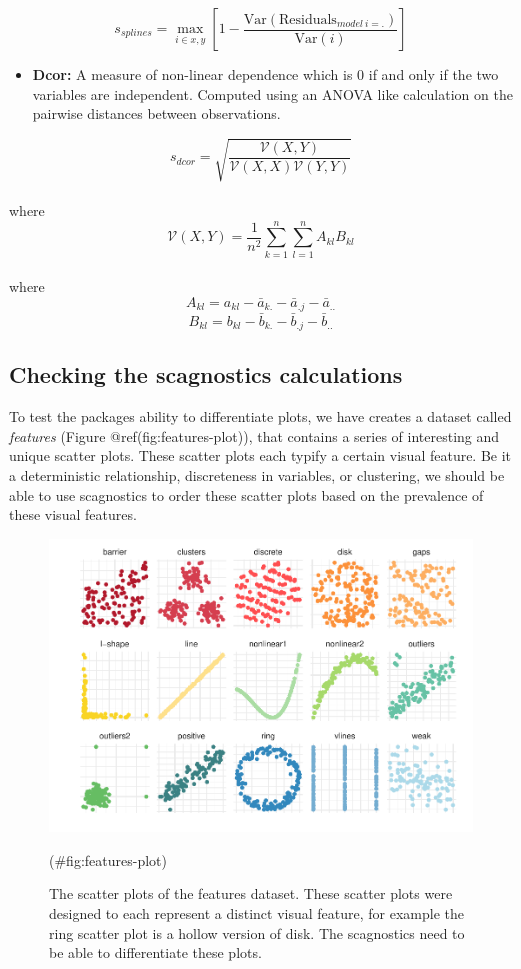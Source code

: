 \[s_{splines}=\max_{i\in x,y}\left[ 1-\frac{\mbox{Var}(\mbox{Residuals}_{model~i=.})}{\mbox{Var}(i)}\right] \]

\begin{itemize}
\tightlist
\item
  \textbf{Dcor:} A measure of non-linear dependence which is 0 if and
  only if the two variables are independent. Computed using an ANOVA
  like calculation on the pairwise distances between observations.
\end{itemize}

\[s_{dcor}= \sqrt{\frac{\mathcal{V}(X,Y)}{\mathcal{V}(X,X)\mathcal{V}(Y,Y)}}\]\\
where \[\mathcal{V}
(X,Y)=\frac{1}{n^2}\sum_{k=1}^n\sum_{l=1}^nA_{kl}B_{kl}\]\\
where \[A_{kl}=a_{kl}-\bar{a}_{k.}-\bar{a}_{.j}-\bar{a}_{..}\]
\[B_{kl}=b_{kl}-\bar{b}_{k.}-\bar{b}_{.j}-\bar{b}_{..}\]

\hypertarget{checking-the-scagnostics-calculations}{%
\subsection{Checking the scagnostics
calculations}\label{checking-the-scagnostics-calculations}}

To test the packages ability to differentiate plots, we have creates a
dataset called \emph{features} (Figure @ref(fig:features-plot)), that
contains a series of interesting and unique scatter plots. These scatter
plots each typify a certain visual feature. Be it a deterministic
relationship, discreteness in variables, or clustering, we should be
able to use scagnostics to order these scatter plots based on the
prevalence of these visual features.

\begin{Schunk}
\begin{figure}
\includegraphics[width=1\linewidth]{mason-lee-laa-cook_files/figure-latex/features-plot-1} \caption[The scatter plots of the features dataset]{The scatter plots of the features dataset. These scatter plots were designed to each represent a distinct visual feature, for example the ring scatter plot is a hollow version of disk. The scagnostics need to be able to differentiate these plots.}(\#fig:features-plot)
\end{figure}
\end{Schunk}

